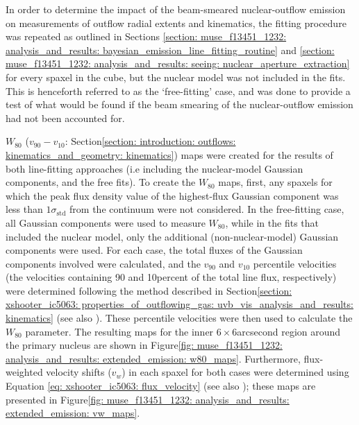 In order to determine the impact of the beam-smeared nuclear-outflow emission on measurements of outflow radial extents and kinematics, the fitting procedure was repeated as outlined in Sections \ref{section: muse_f13451_1232: analysis_and_results: bayesian_emission_line_fitting_routine} and \ref{section: muse_f13451_1232: analysis_and_results: seeing: nuclear_aperture_extraction} for every spaxel in the cube, but the nuclear model was not included in the fits. This is henceforth referred to as the `free-fitting' case, and was done to provide a test of what would be found if the beam smearing of the nuclear-outflow emission had not been accounted for.

$W_\mathrm{80}$ ($v_\mathrm{90}-v_\mathrm{10}$: Section\;\ref{section: introduction: outflows: kinematics_and_geometry: kinematics}) maps were created for the results of both line-fitting approaches (i.e including the nuclear-model Gaussian components, and the free fits). To create the $W_\mathrm{80}$ maps, first, any spaxels for which the peak flux density value of the highest-flux Gaussian component was less than $1\sigma_\mathrm{std}$ from the continuum were not considered. In the free-fitting case, all Gaussian components were used to measure $W_\mathrm{80}$, while in the fits that included the nuclear model, only the additional (non-nuclear-model) Gaussian components were used. For each case, the total fluxes of the Gaussian components involved were calculated, and the $v_\mathrm{90}$ and $v_\mathrm{10}$ percentile velocities (the velocities containing 90 and 10\;per\;cent of the total line flux, respectively) were determined following the method described in Section\;\ref{section: xshooter_ic5063: properties_of_outflowing_gas: uvb_vis_analysis_and_results: kinematics} (see also \citealt{Rose2018}). These percentile velocities were then used to calculate the $W_\mathrm{80}$ parameter. The resulting maps for the inner $6\times6$\;arcsecond region around the primary nucleus are shown in Figure\;\ref{fig: muse_f13451_1232: analysis_and_results: extended_emission: w80_maps}. Furthermore, flux-weighted velocity shifts ($v_w$) in each spaxel for both cases were determined using Equation \ref{eq: xshooter_ic5063: flux_velocity} (see also \citealt{Rose2018}); these maps are presented in Figure\;\ref{fig: muse_f13451_1232: analysis_and_results: extended_emission: vw_maps}.

